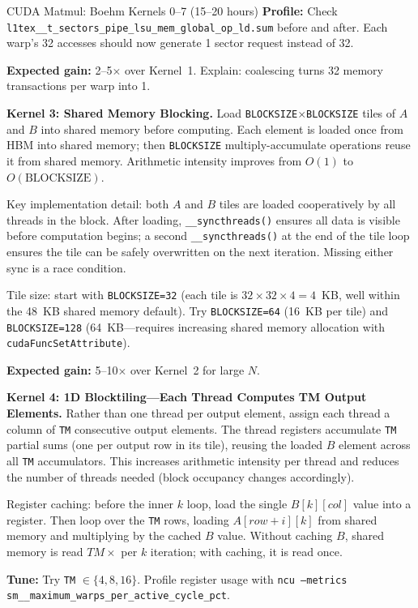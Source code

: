 \begin{exercise}{CUDA Matmul: Boehm Kernels 0--7 (15--20 hours)}
\textbf{Profile:} Check \texttt{l1tex\_\_t\_sectors\_pipe\_lsu\_mem\_global\_op\_ld.sum} before and after. Each warp's 32 accesses should now generate 1 sector request instead of 32.

\textbf{Expected gain:} 2--5$\times$ over Kernel~1. Explain: coalescing turns 32 memory transactions per warp into 1.

\medskip
\textbf{Kernel 3: Shared Memory Blocking.}
Load \texttt{BLOCKSIZE}$\times$\texttt{BLOCKSIZE} tiles of $A$ and $B$ into shared memory before computing. Each element is loaded once from HBM into shared memory; then \texttt{BLOCKSIZE} multiply-accumulate operations reuse it from shared memory. Arithmetic intensity improves from $O(1)$ to $O(\text{BLOCKSIZE})$.

Key implementation detail: both $A$ and $B$ tiles are loaded cooperatively by all threads in the block. After loading, \texttt{\_\_syncthreads()} ensures all data is visible before computation begins; a second \texttt{\_\_syncthreads()} at the end of the tile loop ensures the tile can be safely overwritten on the next iteration. Missing either sync is a race condition.

Tile size: start with \texttt{BLOCKSIZE=32} (each tile is $32 \times 32 \times 4 = 4$~KB, well within the 48~KB shared memory default). Try \texttt{BLOCKSIZE=64} (16~KB per tile) and \texttt{BLOCKSIZE=128} (64~KB---requires increasing shared memory allocation with \texttt{cudaFuncSetAttribute}).

\textbf{Expected gain:} 5--10$\times$ over Kernel~2 for large $N$.

\medskip
\textbf{Kernel 4: 1D Blocktiling---Each Thread Computes TM Output Elements.}
Rather than one thread per output element, assign each thread a column of \texttt{TM} consecutive output elements. The thread registers accumulate \texttt{TM} partial sums (one per output row in its tile), reusing the loaded $B$ element across all \texttt{TM} accumulators. This increases arithmetic intensity per thread and reduces the number of threads needed (block occupancy changes accordingly).

Register caching: before the inner $k$ loop, load the single $B[k][col]$ value into a register. Then loop over the \texttt{TM} rows, loading $A[row+i][k]$ from shared memory and multiplying by the cached $B$ value. Without caching $B$, shared memory is read $TM \times$ per $k$ iteration; with caching, it is read once.

\textbf{Tune:} Try \texttt{TM} $\in \{4, 8, 16\}$. Profile register usage with \texttt{ncu --metrics sm\_\_maximum\_warps\_per\_active\_cycle\_pct}.


\end{exercise}
